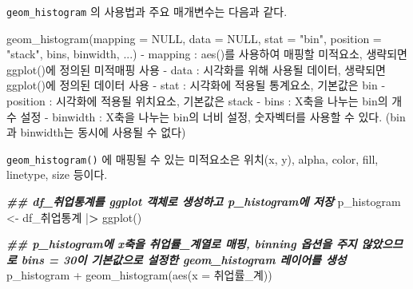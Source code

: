 \documentclass[
]{article}
\newenvironment{Shaded}{\begin{snugshade}}{\end{snugshade}}
\newcommand{\AttributeTok}[1]{\textcolor[rgb]{0.77,0.63,0.00}{#1}}
\newcommand{\ConstantTok}[1]{\textcolor[rgb]{0.00,0.00,0.00}{#1}}
\newcommand{\DocumentationTok}[1]{\textcolor[rgb]{0.56,0.35,0.01}{\textbf{\textit{#1}}}}
\newcommand{\ErrorTok}[1]{\textcolor[rgb]{0.64,0.00,0.00}{\textbf{#1}}}
\newcommand{\FunctionTok}[1]{\textcolor[rgb]{0.00,0.00,0.00}{#1}}
\newcommand{\NormalTok}[1]{#1}
\newcommand{\OtherTok}[1]{\textcolor[rgb]{0.56,0.35,0.01}{#1}}
\newcommand{\SpecialCharTok}[1]{\textcolor[rgb]{0.00,0.00,0.00}{#1}}
\newcommand{\StringTok}[1]{\textcolor[rgb]{0.31,0.60,0.02}{#1}}
\begin{document}
\texttt{geom\_histogram} 의 사용법과 주요 매개변수는 다음과 같다.

\begin{Shaded}
\begin{Highlighting}[]
\FunctionTok{geom\_histogram}\NormalTok{(}\AttributeTok{mapping =} \ConstantTok{NULL}\NormalTok{, }\AttributeTok{data =} \ConstantTok{NULL}\NormalTok{, }\AttributeTok{stat =} \StringTok{"bin"}\NormalTok{, }\AttributeTok{position =} \StringTok{"stack"}\NormalTok{, bins, binwidth, ...)}
  \SpecialCharTok{{-}}\NormalTok{ mapping }\SpecialCharTok{:} \FunctionTok{aes}\NormalTok{()를 사용하여 매핑할 미적요소, 생략되면 }\FunctionTok{ggplot}\NormalTok{()에 정의된 미적매핑 사용}
  \SpecialCharTok{{-}}\NormalTok{ data }\SpecialCharTok{:}\NormalTok{ 시각화를 위해 사용될 데이터, 생략되면 }\FunctionTok{ggplot}\NormalTok{()에 정의된 데이터 사용}
  \SpecialCharTok{{-}}\NormalTok{ stat }\SpecialCharTok{:}\NormalTok{ 시각화에 적용될 통계요소, 기본값은 }\StringTok{\textquotesingle{}bin\textquotesingle{}}
  \SpecialCharTok{{-}}\NormalTok{ position }\SpecialCharTok{:}\NormalTok{ 시각화에 적용될 위치요소, 기본값은 }\StringTok{\textquotesingle{}stack\textquotesingle{}}
  \SpecialCharTok{{-}}\NormalTok{ bins }\SpecialCharTok{:}\NormalTok{ X축을 나누는 bin의 개수 설정}
  \SpecialCharTok{{-}}\NormalTok{ binwidth }\SpecialCharTok{:}\NormalTok{ X축을 나누는 bin의 너비 설정, 숫자벡터를 사용할 수 있다. (bin과 binwidth는 동시에 사용될 수 없다)}
\end{Highlighting}
\end{Shaded}

\texttt{geom\_histogram()} 에 매핑될 수 있는 미적요소은 위치(x, y), alpha, color, fill, linetype, size 등이다.

\begin{Shaded}
\begin{Highlighting}[]
\DocumentationTok{\#\#  df\_취업통계를 ggplot 객체로 생성하고 p\_histogram에 저장}
\NormalTok{p\_histogram }\OtherTok{\textless{}{-}}\NormalTok{ df\_취업통계 }\SpecialCharTok{|}\ErrorTok{\textgreater{}}
  \FunctionTok{ggplot}\NormalTok{()}

\DocumentationTok{\#\# p\_histogram에 x축을 \textquotesingle{}취업률\_계\textquotesingle{}열로 매핑, binning 옵션을 주지 않았으므로 bins = 30이 기본값으로 설정한 geom\_histogram 레이어를 생성 }
\NormalTok{p\_histogram }\SpecialCharTok{+}
  \FunctionTok{geom\_histogram}\NormalTok{(}\FunctionTok{aes}\NormalTok{(}\AttributeTok{x =}\NormalTok{ 취업률\_계))}
\end{Highlighting}
\end{Shaded}
\end{document}
